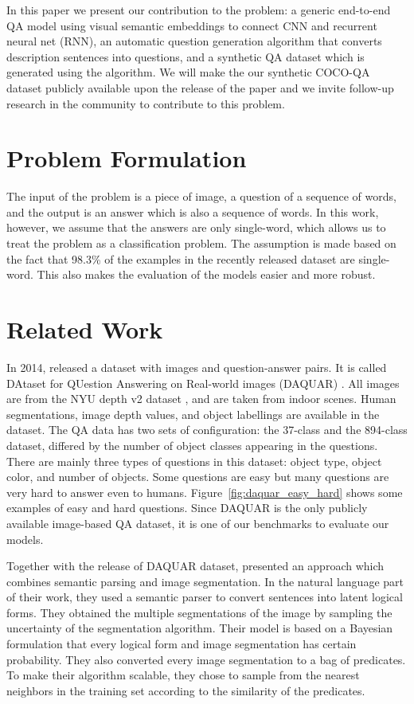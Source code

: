 \documentclass{article}
\renewcommand{\#}[1]{\textbf{#1}}
\begin{document}
In this paper we present our contribution to the problem: a generic end-to-end QA model using visual semantic embeddings to connect CNN and recurrent neural net (RNN), an automatic question generation algorithm that converts description sentences into questions, and a synthetic QA dataset which is generated using the algorithm. We will make the our synthetic COCO-QA dataset publicly available upon the release of the paper and we invite follow-up research in the community to contribute to this problem.

\section{Problem Formulation}
The input of the problem is a piece of image, a question of a sequence of words, and the output is an answer which is also a sequence of words. In this work, however, we assume that the answers are only single-word, which allows us to treat the problem as a classification problem. The assumption is made based on the fact that 98.3\% of the examples in the recently released dataset \cite{malinowski14a} are single-word. This also makes the evaluation of the models easier and more robust.

\section{Related Work}
In 2014, \cite{malinowski14a} released a dataset with images and question-answer pairs. It is called DAtaset for QUestion Answering on Real-world images (DAQUAR) . All images are from the NYU depth v2 dataset \cite{silberman12}, and are taken from indoor scenes. Human segmentations, image depth values, and object labellings are available in the dataset. The QA data has two sets of configuration: the 37-class and the 894-class dataset, differed by the number of object classes appearing in the questions. There are mainly three types of questions in this dataset: object type, object color, and number of objects. Some questions are easy but many questions are very hard to answer even to humans. Figure~\ref{fig:daquar_easy_hard} shows some examples of easy and hard questions. Since DAQUAR is the only publicly available image-based QA dataset, it is one of our benchmarks to evaluate our models.

Together with the release of DAQUAR dataset, \cite{malinowski14b} presented an approach which combines semantic parsing and image segmentation. In the natural language part of their work, they used a semantic parser \cite{liang13} to convert sentences into latent logical forms. They obtained the multiple segmentations of the image by sampling the uncertainty of the segmentation algorithm. Their model is based on a Bayesian formulation that every logical form and image segmentation has certain probability. They also converted every image segmentation to a bag of predicates. To make their algorithm scalable, they chose to sample from the nearest neighbors in the training set according to the similarity of the predicates.
\end{document}
